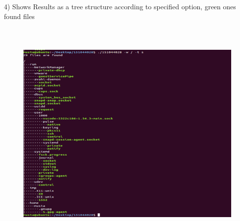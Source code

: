 \documentclass[14pt]{article}
\begin{document}
\vspace{\baselineskip}4) Shows Results as a tree structure according to specified option, green ones found files



\begin{figure}[H]
	\begin{Center}
		\includegraphics[width=5in,height=4.5in]{./media/image3.png}
	\end{Center}
\end{figure}




\vspace{\baselineskip}
\vspace{\baselineskip}

\vspace{\baselineskip}

\vspace{\baselineskip}

\vspace{\baselineskip}

\vspace{\baselineskip}

\vspace{\baselineskip}

\vspace{\baselineskip}

\vspace{\baselineskip}

\vspace{\baselineskip}
\end{document}
